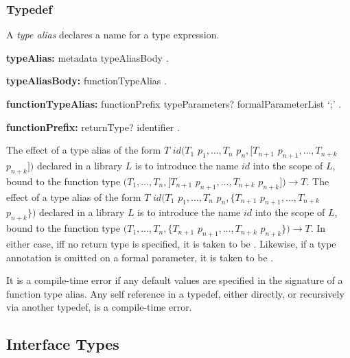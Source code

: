 \documentclass{article}
\newcommand{\code}[1]{{\sf #1}}
\begin{document}
\subsubsection{Typedef}

\LMHash{}
A {\em type alias} declares a name for a type expression.


\begin{grammar}

{\bf typeAlias:}
 	metadata  \TYPEDEF{} typeAliasBody
	.

{\bf typeAliasBody:}
	functionTypeAlias
	.

{\bf functionTypeAlias:}
       functionPrefix  typeParameters? formalParameterList `{\escapegrammar ;}'
    .

    {\bf functionPrefix:}
    returnType? identifier
    .

 \end{grammar}

\LMHash{}
 The effect of a type alias of the form  \code{\TYPEDEF{} $T$ $id (T_1$ $p_1, \ldots, T_n$ $p_n, [T_{n+1}$ $p_{n+1}, \ldots, T_{n+k}$ $p_{n+k}])$} declared in a library $L$ is to introduce the name $id$ into the scope of $L$, bound to the function type $(T_1, \ldots, T_n, [T_{n+1}$ $p_{n+1}, \ldots, T_{n+k}$ $p_{n+k}])  \rightarrow T$.
The effect of a type alias of the form   \code{\TYPEDEF{} $T$ $id (T_1$ $p_1, \ldots, T_n$ $p_n, \{T_{n+1}$ $p_{n+1}, \ldots, T_{n+k}$ $p_{n+k}\})$} declared in a library $L$ is to introduce the name $id$ into the scope of $L$, bound to the function type $(T_1, \ldots, T_n, \{T_{n+1}$ $p_{n+1}, \ldots, T_{n+k}$ $p_{n+k}\})  \rightarrow T$.
In either case, iff no return type is specified, it is taken to be \DYNAMIC{}. Likewise, if a type annotation is omitted on a formal parameter, it is taken to be \DYNAMIC{}.

\LMHash{}
It is a compile-time error if any default values are specified in the signature of a function type alias.
Any  self reference in a typedef, either directly, or recursively via another typedef, is a compile-time error.



\subsection{Interface Types}
\end{document}
